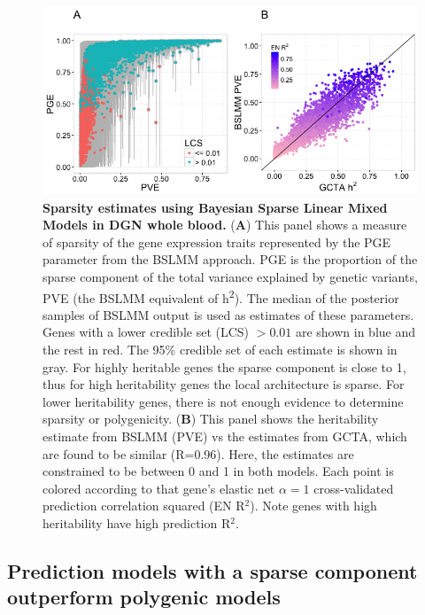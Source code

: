 \documentclass[10pt,letterpaper]{article}
\begin{document}
\begin{figure}[H]
\includegraphics[width=12cm]{Figures/Fig-DGN-BSLMM.png}
\caption{{\bf Sparsity estimates using Bayesian Sparse Linear Mixed Models in DGN whole blood.} 
(\textbf{A}) This panel shows a measure of sparsity of the gene expression traits represented by the PGE parameter from the BSLMM approach. PGE is the proportion of the sparse component of the total variance explained by genetic variants, PVE (the BSLMM equivalent of h\textsuperscript{2}). The median of the posterior samples of BSLMM output is used as estimates of these parameters.
Genes with a lower credible set (LCS) $>0.01$ are shown in blue and the rest in red. The 95\% credible set of each estimate is shown in gray. 
 For highly heritable genes the sparse component is close to 1, thus for high heritability genes the local architecture is sparse. For lower heritability genes, there is not enough evidence to determine sparsity or polygenicity. (\textbf{B}) This panel shows the heritability estimate from BSLMM (PVE) vs the estimates from GCTA, which are found to be similar (R=0.96). Here, the estimates are constrained to be between 0 and 1 in both models. Each point is colored according to that gene's elastic net \(\alpha=1\) cross-validated prediction correlation squared (EN R$^2$). Note genes with high heritability have high prediction R$^2$.
}
\label{fig-dgn-bslmm}
\end{figure}


\subsection*{Prediction models with a sparse component outperform polygenic models}\label{the-effect-of-local-genetic-variation-on-gene-expression-is-sparse-rather-than-polygenic}
\end{document}
